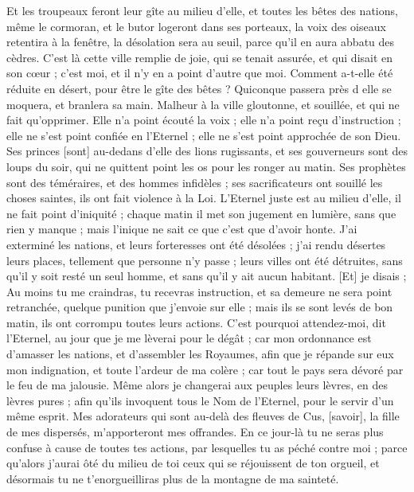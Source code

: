 \begin{multicols}{2}
Et les troupeaux feront leur gîte au milieu d'elle, et toutes les bêtes des nations, même le cormoran, et le butor logeront dans ses porteaux, la voix des oiseaux retentira à la fenêtre, la désolation sera au seuil, parce qu'il en aura abbatu des cèdres.
C'est là cette ville remplie de joie, qui se tenait assurée, et qui disait en son cœur ; c'est moi, et il n'y en a point d'autre que moi. Comment a-t-elle été réduite en désert, pour être le gîte des bêtes ? Quiconque passera près d elle se moquera, et branlera sa main.
\VerseOne{}Malheur à la ville gloutonne, et souillée, et qui ne fait qu'opprimer.
Elle n'a point écouté la voix ; elle n'a point reçu d'instruction ; elle ne s'est point confiée en l'Eternel ; elle ne s'est point approchée de son Dieu.
Ses princes [sont] au-dedans d'elle des lions rugissants, et ses gouverneurs sont des loups du soir, qui ne quittent point les os pour les ronger au matin.
Ses prophètes sont des téméraires, et des hommes infidèles ; ses sacrificateurs ont souillé les choses saintes, ils ont fait violence à la Loi.
L'Eternel juste est au milieu d'elle, il ne fait point d'iniquité ; chaque matin il met son jugement en lumière, sans que rien y manque ; mais l'inique ne sait ce que c'est que d'avoir honte.
J'ai exterminé les nations, et leurs forteresses ont été désolées ; j'ai rendu désertes leurs places, tellement que personne n'y passe ; leurs villes ont été détruites, sans qu'il y soit resté un seul homme, et sans qu'il y ait aucun habitant.
[Et] je disais ; Au moins tu me craindras, tu recevras instruction, et sa demeure ne sera point retranchée, quelque punition que j'envoie sur elle ; mais ils se sont levés de bon matin, ils ont corrompu toutes leurs actions.
C'est pourquoi attendez-moi, dit l'Eternel, au jour que je me lèverai pour le dégât ; car mon ordonnance est d'amasser les nations, et d'assembler les Royaumes, afin que je répande sur eux mon indignation, et toute l'ardeur de ma colère ; car tout le pays sera dévoré par le feu de ma jalousie.
Même alors je changerai aux peuples leurs lèvres, en des lèvres pures ; afin qu'ils invoquent tous le Nom de l'Eternel, pour le servir d'un même esprit.
Mes adorateurs qui sont au-delà des fleuves de Cus, [savoir], la fille de mes dispersés, m'apporteront mes offrandes.
En ce jour-là tu ne seras plus confuse à cause de toutes tes actions, par lesquelles tu as péché contre moi ; parce qu'alors j'aurai ôté du milieu de toi ceux qui se réjouissent de ton orgueil, et désormais tu ne t'enorgueilliras plus de la montagne de ma sainteté.

\end{multicols}
